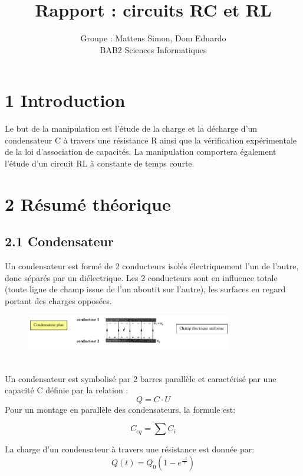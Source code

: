 \documentclass{report}
\author{Groupe : Mattens Simon, Dom Eduardo\\ BAB2 Sciences Informatiques}
\title{Rapport : circuits RC et RL}
\makeatletter
\def\maketitle{%
  \null
  \thispagestyle{empty}%
  \vfill
  \begin{center}\leavevmode
    \normalfont
    {\LARGE \@title\par}%
    \vskip 1cm
    {\Large \@author\par}%
    \vskip 1cm
    {\Large \@date\par}%
  \end{center}%
  \vfill
  \null
  \newpage
  }
\makeatother
\begin{document}
\maketitle

\section*{1 Introduction}
\hspace*{0.5cm}
Le but de la manipulation est l'étude de la charge et la décharge d’un
condensateur C à travers une  résistance  R  ainsi  que  la  vérification expérimentale  de  la  loi d'association  de  capacités. 
La manipulation comportera également l’étude d’un circuit RL à constante de temps courte.

\section*{2 R\'esum\'e th\'eorique}
\subsection*{2.1 Condensateur}
\hspace*{0.5cm}
Un condensateur est formé de 2 conducteurs isolés électriquement l'un de l'autre, donc séparés par un diélectrique. Les 2 conducteurs sont en influence totale (toute ligne de champ issue de l'un aboutit sur l'autre), les surfaces en regard portant des charges opposées.
\begin{figure}[ht!]
\centering
\includegraphics[width=90mm]{cond.png}
\label{overflow}
\end{figure}
\\
Un condensateur est symbolisé par 2 barres parallèle et caractérisé par une capacité C définie par la relation  : 
\begin{equation}
    Q = C\cdot U
\end{equation}
Pour un montage en parall\`ele des condensateurs, la formule est:

\begin{equation}
    C_{eq} =\sum{C_{i}}
\end{equation}

La charge d'un condensateur \`a travers une r\'esistance est donn\'ee par:
\begin{equation}
    Q(t) = Q_{0}(1-e^{\frac{-t}{\tau}})
\end{equation}
\end{document}
